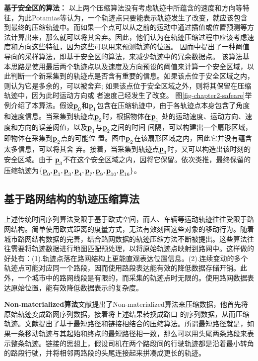 \textbf{基于安全区的算法：}
以上两个压缩算法没有考虑轨迹中所蕴含的速度和方向等特征，为此Potamias\cite{SSDBMSample}等认为，一个轨迹点只要能表示轨迹发生了改变，就应该包含到最终的压缩轨迹中。而如果一个点可以从之前的运动中通过插值或位置预测等方法计算出来，那么就可以将其舍弃。因此，他们认为在轨迹压缩过程中应该考虑速度和方向这些特征，因为这些可以用来预测轨迹的位置。
因而中提出了一种阈值导向的采样算法，即基于安全区的算法，来减少轨迹中的冗余数据点。
该算法基本思路是使用最后两个轨迹点以及速度及方向预设的阈值来计算一个安全区域，以此判断一个新采集到的轨迹点是否含有重要的信息。如果该点位于安全区域之内，则认为它是多余的，可以被舍弃; 如果该点位于安全区域之外，则将其保留在压缩轨迹中，因为此时运动方向或 者速度己经发生了改变。
图\ref{fig-chapter2-safeare}举例介绍了本算法。假设$\emph{{\textbf{p}}}_0$和$\emph{{\textbf{p}}}_1$包含在压缩轨迹中，由于各轨迹点本身包含了角度和速度信息。当采集到轨迹点$\emph{{\textbf{p}}}_2$时，根据物体在$\emph{{\textbf{p}}}_1$ 处的运动速度、运动方向、速度和方向的误差阂值，以及$\emph{{\textbf{p}}}_1$与$\emph{{\textbf{p}}}_2$之间的时间 间隔，可以构建出一个扇形区域，即物体在采集到$\emph{{\textbf{p}}}_2$点的可能位 置。图中$\emph{{\textbf{p}}}_2$在该扇形区域之内，因此它并没有蕴含太多信息，可以将其舍 弃。接着，当采集到轨迹点$\emph{{\textbf{p}}}_3$时，又可以构造出该时刻的安全区域。由于 $\emph{{\textbf{p}}}_3$不在这个安全区域之内，因将它保留。依次类推，最终保留的压缩轨迹为$\{\emph{{\textbf{p}}}_0,\emph{{\textbf{p}}}_1,\emph{{\textbf{p}}}_3,\emph{{\textbf{p}}}_4,\emph{{\textbf{p}}}_7,\emph{{\textbf{p}}}_9,\emph{{\textbf{p}}}_{10},\emph{{\textbf{p}}}_{16}\}$。

\subsection{基于路网结构的轨迹压缩算法}
上述传统时间序列算法受限于基于欧式空间，而人、车辆等运动轨迹往往受限于路网结构。简单使用欧式距离的度量方式，无法有效刻画这些对象的移动行为。随着城市路网结构数据的完善，结合路网数据的轨迹压缩方法不断被提出\cite{YinW04,nonmaterialized,DMDL2,MDL1}。这些算法往往需要将轨迹数据进行地图匹配预处理，以将原始轨迹点映射到路网中。这样做的好处有：(1).轨迹点落在路网结构上更能直观表达位置信息。(2).连续变动的多个轨迹点可能对应同一个路段，因而使用路段表达能有效的降低数据存储开销。此外，一个城市中的路网线段是有限的，而采集的轨迹点时无限的。使用路网数据表达原始位置，能有效降低数据表示的复杂度。

\textbf{Non-materialized算法}文献\cite{YinW04}提出了Non-materialized算法来压缩数据，他首先将原始轨迹变成路网序列数据，接着将上述结果转换成路口 的序列数据，从而压缩轨迹。文献\cite{nonmaterialized}提出了基于最短路径和链接相结合的压缩算法。所谓最短路径就是，如果一条移动轨迹与其起始和终点的最短路径相一致，那么可以用头尾两条路段来表示整条轨迹。链接的思想上，假设司机在两个路段间的行驶轨迹都是沿着最小转角的路段行驶，并将相邻两路段的头尾连接起来拼凑成更长的轨迹。

